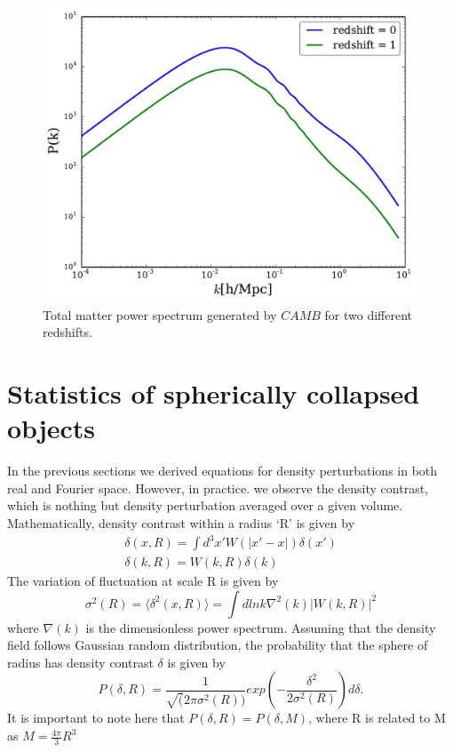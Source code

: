 \begin{figure}[H]
\includegraphics[width = \columnwidth]{figs/ps.pdf}
\caption{Total matter power spectrum generated by $CAMB$ for two different redshifts.}
\label{fig_ps}
\end{figure}

\section{Statistics of spherically collapsed objects}
\label{stats}
In the previous sections we derived equations for density perturbations in both real and Fourier space. However, in practice. we observe the density contrast, which is nothing but density perturbation averaged over a given volume. Mathematically, density contrast within a radius `R' is given by
\begin{eqnarray}
\delta(x, R) = \int d^{3}x' W(|x' - x|) \delta(x') \\
\delta(k, R) = W(k,R) \delta(k)
\end{eqnarray}
The variation of fluctuation at scale R is given by
\begin{equation}
\sigma^{2}(R) = \langle \delta^{2}(x,R) \rangle = \int d lnk \nabla^{2}(k) |W(k,R)|^{2}
\end{equation}
where $\nabla(k)$ is the dimensionless power spectrum.
Assuming that the density field follows Gaussian random distribution, the probability that the sphere of radius has density contrast $\delta$ is given by
\begin{equation}
P(\delta, R) = \frac{1}{\sqrt(2 \pi \sigma^{2}(R))} exp(-\frac{\delta^{2}}{2\sigma^{2}(R)}) d\delta.
\end{equation}
It is important to note here that $P(\delta, R) = P(\delta, M)$, where R is related to M as $M = \frac{4\pi}{3} R^{3}$
